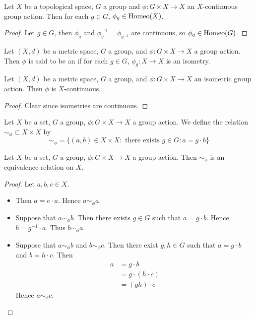 \documentclass{book}
\begin{document}
	\begin{ex}
	Let $X$ be a topological space, $G$ a group and $\phi: G \times X \rightarrow X$ an $X$-continuous group action. Then for each $g \in G$, $\phi_g \in \operatorname{Homeo}(X)$.
	\end{ex}
	
	\begin{proof}
	Let $g \in G$, then $\phi_g$ and $\phi_{g}^{-1} = \phi_{g^{-1}}$ are continuous, so $\phi_g \in \operatorname{Homeo}(G)$. 
	\end{proof}
	
	\begin{defn} \ld{}
	Let $(X, d)$ be a metric space, $G$ a group, and $\phi: G \times X \rightarrow X$ a group action. Then $\phi$ is said to be an  if for each $g \in G$, $\phi_g:X \rightarrow X$ is an isometry. 
	\end{defn}
	
	\begin{ex}
	Let $(X, d)$ be a metric space, $G$ a group, and $\phi: G \times X \rightarrow X$ an isometric group action. Then $\phi$ is $X$-continuous.
	\end{ex}
	
	\begin{proof}
	Clear since isometries are continuous.
	\end{proof}		
	
	\begin{defn}
		Let $X$ be a set, $G$ a group, $\phi: G \times X \rightarrow X$ a group action. We define the relation $\sim_{\phi} \subset X \times X$ by 
		$$\sim_{\phi} = \{(a, b) \in X \times X: \text{ there exists $g \in G: a = g \cdot b$} \}$$
	\end{defn}

	\begin{ex}
		Let $X$ be a set, $G$ a group, $\phi: G \times X \rightarrow X$ a group action. Then $\sim_{\phi}$ is an equivalence relation on $X$.
	\end{ex}

	\begin{proof} Let $a, b, c \in X$.
		\begin{itemize}
			\item {} Then $a = e \cdot a$. Hence $a \sim_{\phi} a$.
			\item {}Suppose that $a \sim_{\phi} b$. Then there exists $g \in G$ such that $a = g \cdot b$. Hence $b = g^{-1} \cdot a$. Thus $b \sim_{\phi} a$.
			\item {}Suppose that $a \sim_{\phi} b$ and $b \sim_{\phi} c$. Then there exist $g, h \in G$ such that $a = g \cdot b$ and $b = h \cdot c$. Then 
			\begin{align*}
				a
				& = g \cdot b \\
				& = g \cdot (h \cdot c) \\
				& = (gh) \cdot c 
			\end{align*}
			Hence $a \sim_{\phi} c$.
		\end{itemize}
	\end{proof}
\end{document}
